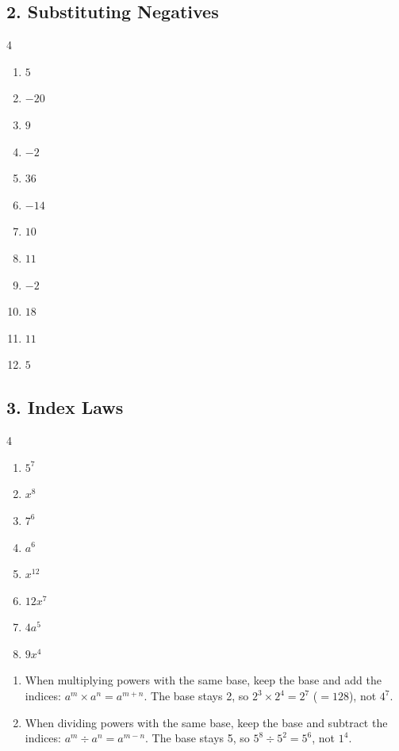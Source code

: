 \documentclass[12pt,a4paper]{article}
\begin{document}
\subsection*{2. Substituting Negatives}
\begin{multicols}{4}\begin{enumerate}[nosep, label=\arabic*., start=1]
\item $5$
\item $-20$
\item $9$
\item $-2$
\item $36$
\item $-14$
\item $10$
\item $11$
\item $-2$
\item $18$
\item $11$
\item $5$
\end{enumerate}\end{multicols}

\subsection*{3. Index Laws}
\begin{multicols}{4}\begin{enumerate}[nosep, label=\arabic*., start=1]
\item $5^{7}$
\item $x^{8}$
\item $7^{6}$
\item $a^{6}$
\item $x^{12}$
\item $12x^{7}$
\item $4a^{5}$
\item $9x^{4}$
\end{enumerate}\end{multicols}
\begin{enumerate}[nosep, label=\arabic*., start=9]
\item When multiplying powers with the same base, keep the base and add the indices: $a^m \times  a^n = a^{m+n}$. The base stays 2, so $2^{3} \times  2^{4} = 2^{7}$ ($= 128$), not $4^{7}$.
\item When dividing powers with the same base, keep the base and subtract the indices: $a^m \div  a^n = a^{m-n}$. The base stays 5, so $5^{8} \div  5^{2} = 5^{6}$, not $1^{4}$.
\end{enumerate}
\end{document}
